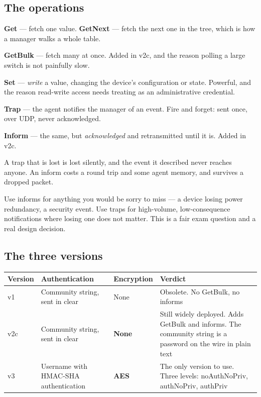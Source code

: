 \subsection{The operations}

\begin{tight}
  \item \textbf{Get} --- fetch one value. \textbf{GetNext} --- fetch the next one
        in the tree, which is how a manager walks a whole table.
  \item \textbf{GetBulk} --- fetch many at once. Added in v2c, and the reason
        polling a large switch is not painfully slow.
  \item \textbf{Set} --- \emph{write} a value, changing the device's
        configuration or state. Powerful, and the reason read-write access needs
        treating as an administrative credential.
  \item \textbf{Trap} --- the agent notifies the manager of an event. Fire and
        forget: sent once, over UDP, never acknowledged.
  \item \textbf{Inform} --- the same, but \emph{acknowledged} and retransmitted
        until it is. Added in v2c.
\end{tight}

\begin{conceptbox}
A trap that is lost is lost silently, and the event it described never reaches
anyone. An inform costs a round trip and some agent memory, and survives a
dropped packet.

Use informs for anything you would be sorry to miss --- a device losing power
redundancy, a security event. Use traps for high-volume, low-consequence
notifications where losing one does not matter. This is a fair exam question and
a real design decision.
\end{conceptbox}

\subsection{The three versions}

\begin{longtable}{@{}L{2.0cm}L{4.6cm}L{4.0cm}L{4.3cm}@{}}
\toprule
{}
\textbf{Version} & \textbf{Authentication} & \textbf{Encryption} & \textbf{Verdict} \\
\midrule
\endhead
v1 & Community string, sent in clear &
None & Obsolete. No GetBulk, no informs \\
v2c & Community string, sent in clear &
\textbf{None} & Still widely deployed. Adds GetBulk and informs. The community
string is a password on the wire in plain text \\
v3 & Username with HMAC-SHA authentication &
\textbf{AES} & The only version to use. Three levels: noAuthNoPriv, authNoPriv,
authPriv \\
\bottomrule
\end{longtable}

